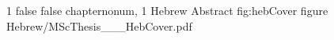 \documentclass[a4paper, 12pt, \pagelayoutformat, onecolumn, bibliography=totoc]{scrreprt}
\begin{document}
        \IncludeMyPDFinReverse
        {\hebabstractpage}
        {1}
        {false}
        {false}
        {chapternonum, 1}
        {Hebrew Abstract}
        {fig:hebCover}
        {figure}
        {Hebrew/MScThesis___HebCover.pdf}

        
    \fi
\fi

\ifLISTFIGS
    \listoffigures
\fi
\end{document}
